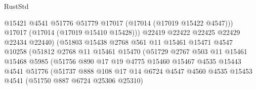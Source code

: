 \begin{lexlean}{RustStd}
\begin{coremodule}
                                      @15421
                                      @4541
                                      @51776
                                      @51779
                                      @17017
                                      (@17014 (@17019 @15422 @4547)))
                                    @17017
                                    (@17014 (@17019 @15410 @15428)))
                                  @22419
                                  @22422
                                  @22425
                                  @22429
                                  @22434
                                  @22440)
                                (@51803
                                  @15438
                                  @2768
                                  @561
                                  @11
                                  @15461
                                  @15471
                                  @4547
                                  @10258
                                  (@51812
                                    @2768
                                    @11
                                    @15461
                                    @15470
                                    (@51729
                                      @2767
                                      @503
                                      @11
                                      @15461
                                      @15468
                                      @5985
                                      (@51756
                                        @890
                                        @17
                                        @19
                                        @4775
                                        @15460
                                        @15467
                                        @4535
                                        @15443
                                        @4541
                                        @51776
                                        (@51737
                                          @888
                                          @108
                                          @17
                                          @14
                                          @6724
                                          @4547
                                          @4560
                                          @4535
                                          @15453
                                          @4541
                                          (@51750 @887 @6724 @25306 @25310)

\end{coremodule}
\end{lexlean}

